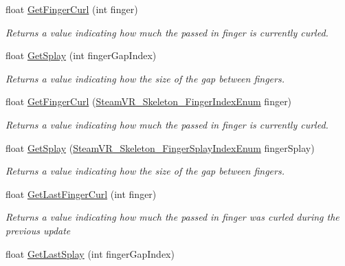 \begin{DoxyCompactItemize}
float \mbox{\hyperlink{class_valve_1_1_v_r_1_1_steam_v_r___action___skeleton_a25eafdaeaf33acc144644bf0e35c2384}{Get\+Finger\+Curl}} (int finger)
\begin{DoxyCompactList}\small\item\em Returns a value indicating how much the passed in finger is currently curled. \end{DoxyCompactList}\item 
float \mbox{\hyperlink{class_valve_1_1_v_r_1_1_steam_v_r___action___skeleton_a773e082038a769ac28aa2b81899de33e}{Get\+Splay}} (int finger\+Gap\+Index)
\begin{DoxyCompactList}\small\item\em Returns a value indicating how the size of the gap between fingers. \end{DoxyCompactList}\item 
float \mbox{\hyperlink{class_valve_1_1_v_r_1_1_steam_v_r___action___skeleton_a8263bb3bd140f1c795c7dfa82ed23557}{Get\+Finger\+Curl}} (\mbox{\hyperlink{namespace_valve_1_1_v_r_ac40c4bdf0a3dcd6e69cad2d85f287c67}{Steam\+V\+R\+\_\+\+Skeleton\+\_\+\+Finger\+Index\+Enum}} finger)
\begin{DoxyCompactList}\small\item\em Returns a value indicating how much the passed in finger is currently curled. \end{DoxyCompactList}\item 
float \mbox{\hyperlink{class_valve_1_1_v_r_1_1_steam_v_r___action___skeleton_ad5a524b798d0f4fcfe29daf558e9b880}{Get\+Splay}} (\mbox{\hyperlink{namespace_valve_1_1_v_r_a43c97e13fe46f0575986b9f74945e0bf}{Steam\+V\+R\+\_\+\+Skeleton\+\_\+\+Finger\+Splay\+Index\+Enum}} finger\+Splay)
\begin{DoxyCompactList}\small\item\em Returns a value indicating how the size of the gap between fingers. \end{DoxyCompactList}\item 
float \mbox{\hyperlink{class_valve_1_1_v_r_1_1_steam_v_r___action___skeleton_aee762f7204379e759e9667fa492eb2ca}{Get\+Last\+Finger\+Curl}} (int finger)
\begin{DoxyCompactList}\small\item\em Returns a value indicating how much the passed in finger was curled during the previous update \end{DoxyCompactList}\item 
float \mbox{\hyperlink{class_valve_1_1_v_r_1_1_steam_v_r___action___skeleton_a9887af0901b58344a5188fea945ff082}{Get\+Last\+Splay}} (int finger\+Gap\+Index)

\end{DoxyCompactItemize}

